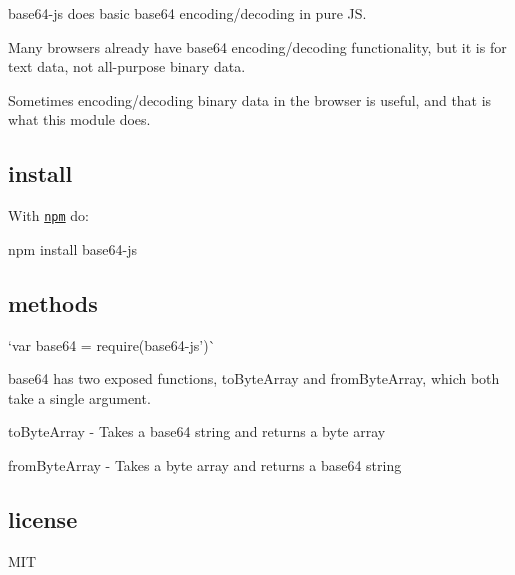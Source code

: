 {\ttfamily base64-\/js} does basic base64 encoding/decoding in pure JS.

\href{http://travis-ci.org/beatgammit/base64-js}{\tt }

\href{https://ci.testling.com/beatgammit/base64-js}{\tt }

Many browsers already have base64 encoding/decoding functionality, but it is for text data, not all-\/purpose binary data.

Sometimes encoding/decoding binary data in the browser is useful, and that is what this module does.

\subsection*{install}

With \href{https://npmjs.org}{\tt npm} do\+:

{\ttfamily npm install base64-\/js}

\subsection*{methods}

`var base64 = require(\textquotesingle{}base64-\/js')\`{}

{\ttfamily base64} has two exposed functions, {\ttfamily to\+Byte\+Array} and {\ttfamily from\+Byte\+Array}, which both take a single argument.


\begin{DoxyItemize}
\item {\ttfamily to\+Byte\+Array} -\/ Takes a base64 string and returns a byte array
\item {\ttfamily from\+Byte\+Array} -\/ Takes a byte array and returns a base64 string
\end{DoxyItemize}

\subsection*{license}

M\+IT 